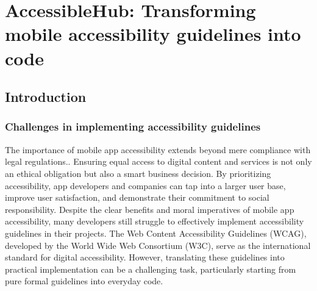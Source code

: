 \chapter{AccessibleHub: Transforming mobile accessibility guidelines into code}
\label{chap:accessibility-toolkit}


\section{Introduction}
\label{sec:intro}

\subsection{Challenges in implementing accessibility guidelines}

The importance of mobile app accessibility extends beyond mere compliance with legal regulations.. Ensuring equal access to digital content and services is not only an ethical obligation but also a smart business decision. By prioritizing accessibility, app developers and companies can tap into a larger user base, improve user satisfaction, and demonstrate their commitment to social responsibility.
Despite the clear benefits and moral imperatives of mobile app accessibility, many developers still struggle to effectively implement accessibility guidelines in their projects. The Web Content Accessibility Guidelines (WCAG), developed by the World Wide Web Consortium (W3C), serve as the international standard for digital accessibility. However, translating these guidelines into practical implementation can be a challenging task, particularly starting from pure formal guidelines into everyday code. \\

